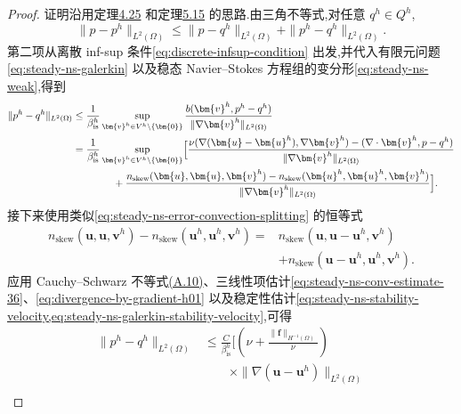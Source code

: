 \begin{proof}
证明沿用定理\hyperref[thm:stokes-error-pressure-l2]{4.25} 和定理\hyperref[thm:oseen-fem-pressure-error]{5.15} 的思路.由三角不等式,对任意 $q^h\in Q^h$,
\begin{equation}\label{eq:steady-ns-pressure-error-triangle}
  \|p-p^h\|_{L^2(\Omega)}
   \le \|p-q^h\|_{L^2(\Omega)}
       +\|p^h-q^h\|_{L^2(\Omega)}.
\end{equation}
第二项从离散 inf-sup 条件\cref{eq:discrete-infsup-condition} 出发,并代入有限元问题\cref{eq:steady-ns-galerkin} 以及稳态 Navier--Stokes 方程组的变分形\cref{eq:steady-ns-weak},得到
\begin{equation}\label{eq:steady-ns-pressure-error-infsup}
\begin{aligned}
  \|p^h-q^h\|_{L^2(\Omega)}
   &\le\frac1{\beta_{\mathrm{is}}^h}
       \sup_{\bm{v}^h\in V^h\setminus\{\bm{0}\}}
       \frac{b(\bm{v}^h,p^h-q^h)}
            {\|\nabla\bm{v}^h\|_{L^2(\Omega)}}\\
   &=\frac1{\beta_{\mathrm{is}}^h}
       \sup_{\bm{v}^h\in V^h\setminus\{\bm{0}\}}
       \Bigl[\frac{\nu(\nabla(\bm{u}-\bm{u}^h),
                         \nabla\bm{v}^h)
                       -(\nabla\cdot\bm{v}^h,p-q^h)}
                      {\|\nabla\bm{v}^h\|_{L^2(\Omega)}}\\
   &\qquad\qquad+\frac{n_{\mathrm{skew}}(\bm{u},\bm{u},\bm{v}^h)
                    -n_{\mathrm{skew}}(\bm{u}^h,\bm{u}^h,\bm{v}^h)}
                   {\|\nabla\bm{v}^h\|_{L^2(\Omega)}}\Bigr].
\end{aligned}
\end{equation}
接下来使用类似\cref{eq:steady-ns-error-convection-splitting} 的恒等式
\[
\begin{aligned}
 n_{\mathrm{skew}}(\bm{u},\bm{u},\bm{v}^h)
   -n_{\mathrm{skew}}(\bm{u}^h,\bm{u}^h,\bm{v}^h)
  ={}&n_{\mathrm{skew}}(\bm{u},\bm{u}-\bm{u}^h,\bm{v}^h)\\
    &+n_{\mathrm{skew}}(\bm{u}-\bm{u}^h,\bm{u}^h,\bm{v}^h).
\end{aligned}
\]
应用 Cauchy--Schwarz 不等式\hyperref[eq:appendix-a-10]{(A.10)}、三线性项估计\cref{eq:steady-ns-conv-estimate-36}、\cref{eq:divergence-by-gradient-h01} 以及稳定性估计\cref{eq:steady-ns-stability-velocity,eq:steady-ns-galerkin-stability-velocity},可得
\[
\begin{aligned}
  \|p^h-q^h\|_{L^2(\Omega)}
    &\le\frac{C}{\beta_{\mathrm{is}}^h}
        \Biggl[
        \left(\nu+\frac{\|\bm{f}\|_{H^{-1}(\Omega)}}{\nu}\right)\\
        &\qquad\times\|\nabla(\bm{u}-\bm{u}^h)\|_{L^2(\Omega)}\\

\end{aligned}\]
\end{proof}
